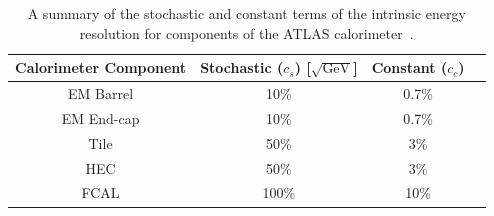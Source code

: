 
{\renewcommand{\arraystretch}{1.2}
\begin{table}[!htb]
\centering
\begin{tabular}{|c||c|c|c|}
\hline
\textbf{Calorimeter Component}  & \textbf{Stochastic ($c_s$) [$\sqrt{\text{GeV}}$]}  & \textbf{Constant ($c_c$)}  \\
\hline
EM Barrel              & 10\%                                       & 0.7\%       \\
EM End-cap             & 10\%                                       & 0.7\%       \\
Tile                   & 50\%                                       &   3\%       \\
HEC                    & 50\%                                       &   3\%       \\
FCAL                   & 100\%                                      &  10\%       \\
\hline
\end{tabular}
\caption[A summary of the stochastic and constant terms of the intrinsic energy resolution for components of the ATLAS calorimeter.]
        {A summary of the stochastic and constant terms of the intrinsic energy resolution for components of the ATLAS calorimeter~\cite{det-ATLAS_Exp}.}
\label{tab:det-calo_noise}
\end{table}
}

